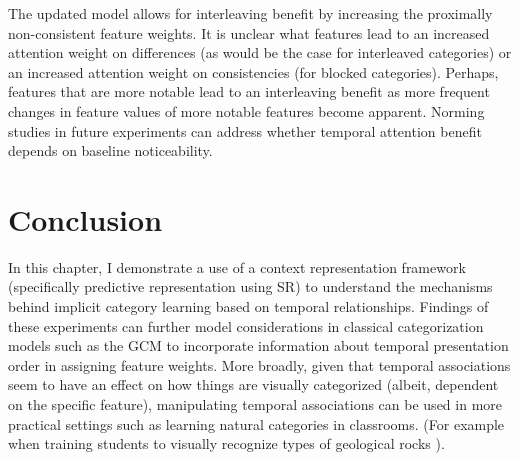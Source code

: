 The updated model allows for interleaving benefit by increasing the proximally non-consistent feature weights. It is unclear what features lead to an increased attention weight on differences (as would be the case for interleaved categories) or an increased attention weight on consistencies (for blocked categories). Perhaps, features that are more notable lead to an interleaving benefit as more frequent changes in feature values of more notable features become apparent. Norming studies in future experiments can address whether temporal attention benefit depends on baseline noticeability. 

\section{Conclusion}
In this chapter, I demonstrate a use of a context representation framework (specifically predictive representation using SR) to understand the mechanisms behind implicit category learning based on temporal relationships. Findings of these experiments can further model considerations in classical categorization models such as the GCM to incorporate information about temporal presentation order in assigning feature weights. More broadly, given that temporal associations seem to have an effect on how things are visually categorized (albeit, dependent on the specific feature), manipulating temporal associations can be used in more practical settings such as learning natural categories in classrooms. (For example when training students to visually recognize types of geological rocks \cite{nosofsky2018toward, nosofsky2017learning}). 